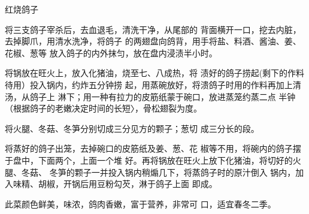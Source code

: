 \begin{recipe}{红烧鸽子}

\ingredients



\cooking

\step 	将三支鸽子宰杀后，去血退毛，清洗干净，从尾部的 背面横开一口，挖去内脏，去掉脚爪，用清水洗净，将鸽子 的两翅盘向鸽背，用手将盐、料酒、酱油、姜、花椒、葱等 放入鸽子的内外抹匀，放在盘内浸渍半小时。

\step 	将锅放在旺火上，放入化猪油，烧至七、八成热，将 渍好的鸽子捞起(剩下的作料待用）投入锅内，约炸五分钟捞 起，用蒸碗放好，将溃鸽子时用的作料再加上清汤，从鸽子上 淋下；用一种有拉力的皮筋纸蒙于碗口，放进蒸笼约蒸二点 半钟（根据鸽子的老嫩决定时间的长短〉，骨松翅裂为度。

\step 	将火腿、冬菇、冬笋分别切成三分见方的颗子；葱切 成三分长的段。

将蒸好的鸽子出笼，去掉碗口的皮筋纸及姜、葱、花 椒等不用，将碗内的鸽子摆于盘中，下面两个，上面一个堆 好。再将锅放在旺火上放下化猪油，将切好的火腿、冬菇、 冬笋的颗子一并投入锅内稍煽几下，将蒸鸽子时的原汁倒入 锅内，加入味精、胡椒，开锅后用豆粉勾芡，淋于鸽子上面 即成。

\notes

此菜颜色鲜美，味浓，鸽肉香嫩，富于营养，非常可 口，适宜春冬二季。

\end{recipe}

